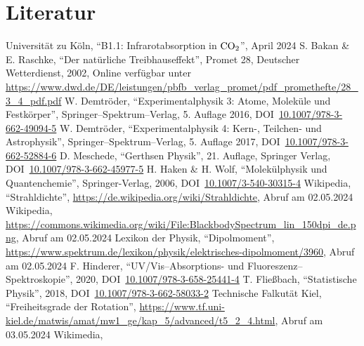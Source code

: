 \documentclass[12pt,a4paper]{scrartcl}
\numberwithin{equation}{section} %
\begin{document}
\clearpage
\hypertarget{literatur}{%
\section{Literatur}\label{literatur}}
\renewcommand{\section}[2]{} %
\begin{thebibliography}{9}
	Universität zu Köln, ``B1.1: Infrarotabsorption in $\ce{CO_2}$'', April 2024
	S. Bakan \& E. Raschke, ``Der natürliche Treibhauseffekt'', Promet 28,
	Deutscher Wetterdienst, 2002, Online verfügbar unter
	\url{https://www.dwd.de/DE/leistungen/pbfb_verlag_promet/pdf_promethefte/28_3_4_pdf.pdf}
	W. Demtröder, ``Experimentalphysik 3: Atome, Moleküle und Festkörper'',
	Springer--Spektrum--Verlag, 5. Auflage 2016,
	DOI~\href{https://doi.org/10.1007/978-3-662-49094-5}{10.1007/978-3-662-49094-5}
	W. Demtröder, ``Experimentalphysik 4: Kern-, Teilchen- und Astrophysik'',
	Springer--Spektrum--Verlag, 5. Auflage 2017, DOI~\href{https://doi.org/10.1007/978-3-662-52884-6}{10.1007/978-3-662-52884-6}
	D. Meschede, ``Gerthsen Physik'', 21. Auflage, Springer Verlag,
	DOI~\href{https://doi.org/10.1007/978-3-662-45977-5}{10.1007/978-3-662-45977-5}
	H. Haken \& H. Wolf, ``Molekülphysik und Quantenchemie'', Springer-Verlag, 2006,
	DOI~\href{https://doi.org/10.1007/3-540-30315-4}{10.1007/3-540-30315-4}
	Wikipedia, ``Strahldichte'',
	\url{https://de.wikipedia.org/wiki/Strahldichte}, Abruf am 02.05.2024
	Wikipedia, \url{https://commons.wikimedia.org/wiki/File:BlackbodySpectrum_lin_150dpi_de.png},
	Abruf am 02.05.2024
	Lexikon der Physik, ``Dipolmoment'',
	\url{https://www.spektrum.de/lexikon/physik/elektrisches-dipolmoment/3960},
	Abruf am 02.05.2024
	F. Hinderer, ``UV/Vis--Absorptions- und Fluoreszenz--Spektroskopie'',
	2020,
	DOI~\href{https://doi.org/10.1007/978-3-658-25441-4}{10.1007/978-3-658-25441-4}
	T. Fließbach, ``Statistische Physik'', 2018,
	DOI~\href{https://doi.org/10.1007/978-3-662-58033-2}{10.1007/978-3-662-58033-2}
	Technische Falkutät Kiel, ``Freiheitsgrade der Rotation'',
	\url{https://www.tf.uni-kiel.de/matwis/amat/mw1_ge/kap_5/advanced/t5_2_4.html},
	Abruf am 03.05.2024
	Wikimedia,

\end{thebibliography}
\end{document}
